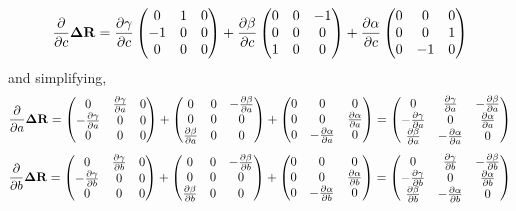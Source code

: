 \documentclass{article}
\def\vec#1{\ensuremath{\mathrm{\bf #1}}}
\def\partder#1#2{\ensuremath{\frac{\partial #1}{\partial #2}}}
\begin{document}
\[
\partder{}{c} \vec{\Delta R} = 
\partder{\gamma}{c}
\begin{pmatrix}
 0 & 1 & 0 \\
 -1 & 0 & 0 \\
 0 & 0 & 0  
 \end{pmatrix}
 + \partder{\beta}{c}
\begin{pmatrix}
 0 & 0 & -1 \\
 0 & 0 & 0 \\
 1 & 0 & 0  
 \end{pmatrix}
 + \partder{\alpha}{c}
\begin{pmatrix}
 0 & 0 & 0 \\
 0 & 0 & 1 \\
 0 & -1 & 0  
 \end{pmatrix}
\]
and simplifying,
\[
\partder{}{a} \vec{\Delta R} = 
\begin{pmatrix}
 0 & \partder{\gamma}{a} & 0 \\
 -\partder{\gamma}{a} & 0 & 0 \\
 0 & 0 & 0  
 \end{pmatrix}
 + 
\begin{pmatrix}
 0 & 0 & -\partder{\beta}{a}\\
 0 & 0 & 0 \\
 \partder{\beta}{a} & 0 & 0  
 \end{pmatrix}
 + 
\begin{pmatrix}
 0 & 0 & 0 \\
 0 & 0 & \partder{\alpha}{a} \\
 0 & -\partder{\alpha}{a} & 0  
 \end{pmatrix}
=
\begin{pmatrix}
 0 & \partder{\gamma}{a} & -\partder{\beta}{a} \\
 -\partder{\gamma}{a} & 0 & \partder{\alpha}{a} \\
 \partder{\beta}{a} & -\partder{\alpha}{a} & 0  
 \end{pmatrix}
\]
\[
\partder{}{b} \vec{\Delta R} = 
\begin{pmatrix}
 0 & \partder{\gamma}{b} & 0 \\
 -\partder{\gamma}{b} & 0 & 0 \\
 0 & 0 & 0  
 \end{pmatrix}
 + 
\begin{pmatrix}
 0 & 0 & -\partder{\beta}{b}\\
 0 & 0 & 0 \\
 \partder{\beta}{b} & 0 & 0  
 \end{pmatrix}
 + 
\begin{pmatrix}
 0 & 0 & 0 \\
 0 & 0 & \partder{\alpha}{b} \\
 0 & -\partder{\alpha}{b} & 0  
 \end{pmatrix}
=
\begin{pmatrix}
 0 & \partder{\gamma}{b} & -\partder{\beta}{b} \\
 -\partder{\gamma}{b} & 0 & \partder{\alpha}{b} \\
 \partder{\beta}{b} & -\partder{\alpha}{b} & 0  
 \end{pmatrix}
\]
\end{document}
